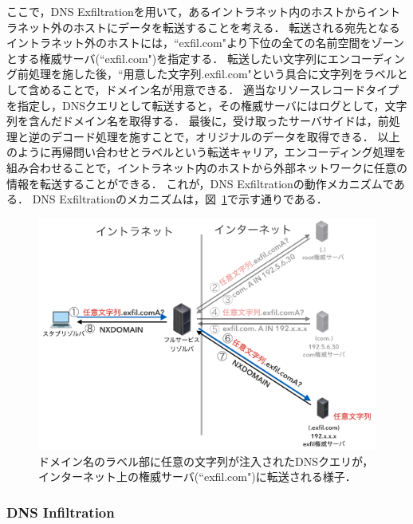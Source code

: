 ここで，DNS Exfiltrationを用いて，あるイントラネット内のホストからイントラネット外のホストにデータを転送することを考える．
転送される宛先となるイントラネット外のホストには，``exfil.com"より下位の全ての名前空間をゾーンとする権威サーバ(``exfil.com")を指定する．
転送したい文字列にエンコーディング前処理を施した後，``用意した文字列.exfil.com"という具合に文字列をラベルとして含めることで，ドメイン名が用意できる．
適当なリソースレコードタイプを指定し，DNSクエリとして転送すると，その権威サーバにはログとして，文字列を含んだドメイン名を取得する．
最後に，受け取ったサーバサイドは，前処理と逆のデコード処理を施すことで，オリジナルのデータを取得できる．
以上のように再帰問い合わせとラベルという転送キャリア，エンコーディング処理を組み合わせることで，イントラネット内のホストから外部ネットワークに任意の情報を転送することができる．
これが，DNS Exfiltrationの動作メカニズムである．
DNS Exfiltrationのメカニズムは，図~\ref{fig:dns-exfiltration}で示す通りである．
\begin{figure}[htbp]
 \centering
 \includegraphics[scale=0.6]{figure/dns-exfiltration.png}
 \caption[DNS Exfiltrationの概略図]{ドメイン名のラベル部に任意の文字列が注入されたDNSクエリが，インターネット上の権威サーバ(``exfil.com")に転送される様子．}
 \label{fig:dns-exfiltration}
\end{figure}



\subsubsection{DNS Infiltration}
\label{sec:dns-infiltration}

